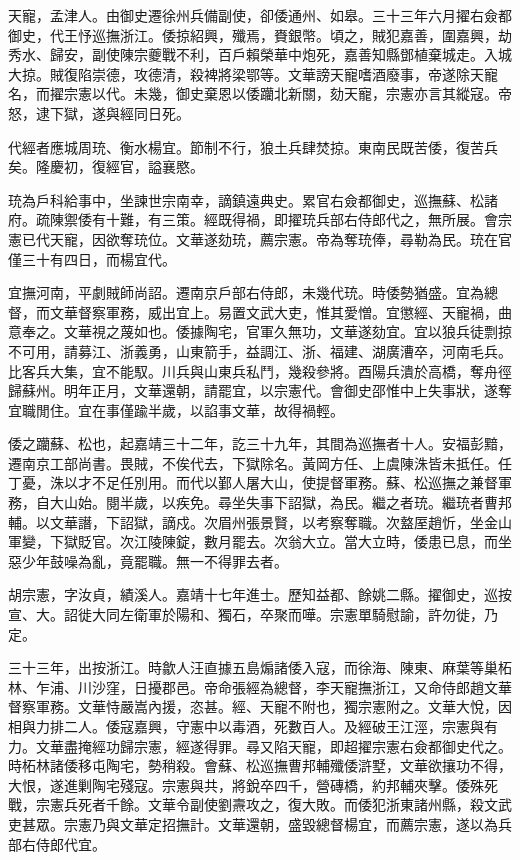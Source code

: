 \begin{pinyinscope}
天寵，孟津人。由御史遷徐州兵備副使，卻倭通州、如皋。三十三年六月擢右僉都御史，代王忬巡撫浙江。倭掠紹興，殲焉，賚銀幣。頃之，賊犯嘉善，圍嘉興，劫秀水、歸安，副使陳宗夔戰不利，百戶賴榮華中炮死，嘉善知縣鄧植棄城走。入城大掠。賊復陷崇德，攻德清，殺裨將梁鄂等。文華謗天寵嗜酒廢事，帝遂除天寵名，而擢宗憲以代。未幾，御史棄恩以倭躪北新關，劾天寵，宗憲亦言其縱寇。帝怒，逮下獄，遂與經同日死。

代經者應城周珫、衡水楊宜。節制不行，狼土兵肆焚掠。東南民既苦倭，復苦兵矣。隆慶初，復經官，謚襄愍。

珫為戶科給事中，坐諫世宗南幸，謫鎮遠典史。累官右僉都御史，巡撫蘇、松諸府。疏陳禦倭有十難，有三策。經既得禍，即擢珫兵部右侍郎代之，無所展。會宗憲已代天寵，因欲奪珫位。文華遂劾珫，薦宗憲。帝為奪珫俸，尋勒為民。珫在官僅三十有四日，而楊宜代。

宜撫河南，平劇賊師尚詔。遷南京戶部右侍郎，未幾代珫。時倭勢猶盛。宜為總督，而文華督察軍務，威出宜上。易置文武大吏，惟其愛憎。宜懲經、天寵禍，曲意奉之。文華視之蔑如也。倭據陶宅，官軍久無功，文華遂劾宜。宜以狼兵徒剽掠不可用，請募江、浙義勇，山東箭手，益調江、浙、福建、湖廣漕卒，河南毛兵。比客兵大集，宜不能馭。川兵與山東兵私鬥，幾殺參將。酉陽兵潰於高橋，奪舟徑歸蘇州。明年正月，文華還朝，請罷宜，以宗憲代。會御史邵惟中上失事狀，遂奪宜職閒住。宜在事僅踰半歲，以諂事文華，故得禍輕。

倭之躪蘇、松也，起嘉靖三十二年，訖三十九年，其間為巡撫者十人。安福彭黯，遷南京工部尚書。畏賊，不俟代去，下獄除名。黃岡方任、上虞陳洙皆未抵任。任丁憂，洙以才不足任別用。而代以鄞人屠大山，使提督軍務。蘇、松巡撫之兼督軍務，自大山始。閱半歲，以疾免。尋坐失事下詔獄，為民。繼之者珫。繼珫者曹邦輔。以文華譖，下詔獄，謫戍。次眉州張景賢，以考察奪職。次盩厔趙忻，坐金山軍變，下獄貶官。次江陵陳錠，數月罷去。次翁大立。當大立時，倭患已息，而坐惡少年鼓噪為亂，竟罷職。無一不得罪去者。

胡宗憲，字汝貞，績溪人。嘉靖十七年進士。歷知益都、餘姚二縣。擢御史，巡按宣、大。詔徙大同左衛軍於陽和、獨石，卒聚而嘩。宗憲單騎慰諭，許勿徙，乃定。

三十三年，出按浙江。時歙人汪直據五島煽諸倭入寇，而徐海、陳東、麻葉等巢柘林、乍浦、川沙窪，日擾郡邑。帝命張經為總督，李天寵撫浙江，又命侍郎趙文華督察軍務。文華恃嚴嵩內援，恣甚。經、天寵不附也，獨宗憲附之。文華大悅，因相與力排二人。倭寇嘉興，守憲中以毒酒，死數百人。及經破王江涇，宗憲與有力。文華盡掩經功歸宗憲，經遂得罪。尋又陷天寵，即超擢宗憲右僉都御史代之。時柘林諸倭移屯陶宅，勢稍殺。會蘇、松巡撫曹邦輔殲倭滸墅，文華欲攘功不得，大恨，遂進剿陶宅殘寇。宗憲與共，將銳卒四千，營磚橋，約邦輔夾擊。倭殊死戰，宗憲兵死者千餘。文華令副使劉燾攻之，復大敗。而倭犯浙東諸州縣，殺文武吏甚眾。宗憲乃與文華定招撫計。文華還朝，盛毀總督楊宜，而薦宗憲，遂以為兵部右侍郎代宜。


\end{pinyinscope}
